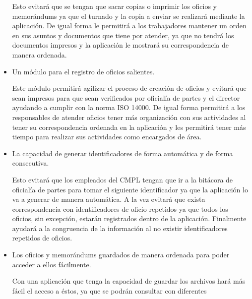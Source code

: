 \begin{itemize}
Esto evitará que se tengan que sacar copias o imprimir los oficios y memorándums ya que el turnado y la copia a enviar se realizará mediante la aplicación. De igual forma le permitirá a los trabajadores mantener un orden en sus asuntos y documentos que tiene por atender, ya que no tendrá los documentos impresos y la aplicación le mostrará su correspondencia de manera ordenada.
	

	\item Un módulo para el registro de oficios salientes.	
	
Este módulo permitirá agilizar el proceso de creación de oficios y evitará que sean impresos para que sean verificados por oficialía de partes y el director ayudando a cumplir con la norma ISO 14000. De igual forma permitirá a los responsables de atender oficios tener más organización con sus actividades al tener su correspondencia ordenada en la aplicación y les permitirá tener más tiempo para realizar sus actividades como encargados de área.

	\item La capacidad de generar identificadores de forma automática y de forma consecutiva.		
	
Esto evitará que los empleados del CMPL tengan que ir a la bitácora de oficialía de partes para tomar el siguiente identificador ya que la aplicación lo va a generar de manera automática. A la vez evitará que exista correspondencia con identificadores de oficio repetidos ya que todos los oficios, sin excepción, estarán registrados dentro de la aplicación. Finalmente ayudará a la congruencia de la información al no existir identificadores repetidos de oficios.

	\item Los oficios y memorándums guardados de manera ordenada para poder acceder a ellos fácilmente.	
	
Con una aplicación que tenga la capacidad de guardar los archivos hará más fácil el acceso a éstos, ya que se podrán consultar con diferentes


	
\end{itemize}


